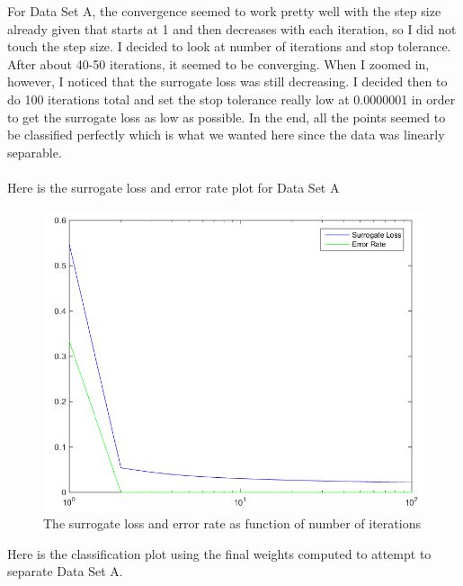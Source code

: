 \documentclass[twoside,11pt]{article}
\theoremstyle{definition}
\begin{document}
For Data Set A, the convergence seemed to work pretty well with the step size already given that starts at 1 and then decreases with each iteration, so I did not touch the step size. I decided to look at number of iterations and stop tolerance. After about 40-50 iterations, it seemed to be converging. When I zoomed in, however, I noticed that the surrogate loss was still decreasing. I decided then to do 100 iterations total and set the stop tolerance really low at 0.0000001 in order to get the surrogate loss as low as possible. In the end, all the points seemed to be classified perfectly which is what we wanted here since the data was linearly separable. \\
\\
Here is the surrogate loss and error rate plot for Data Set A\\
\begin{figure}[h]
\centering
\includegraphics[width=5 in]{prob1fPlotA1.png}
\caption{The surrogate loss and error rate as function of number of iterations}
\end{figure}

\newpage
Here is the classification plot using the final weights computed to attempt to separate Data Set A.\\
\end{document}
